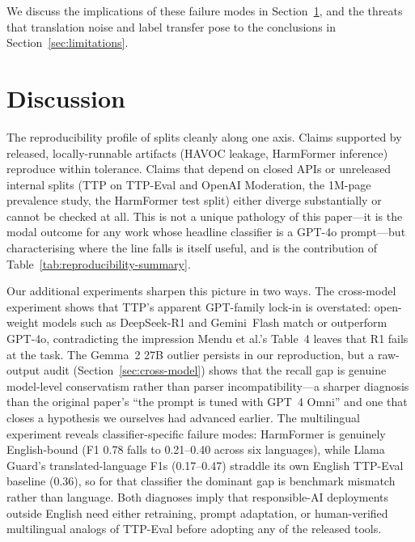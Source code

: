 \documentclass[10pt]{article} %
\begin{document}
We discuss the implications of these failure modes in Section~\ref{sec:discussion}, and the threats that translation noise and label transfer pose to the conclusions in Section~\ref{sec:limitations}.



\section{Discussion}
\label{sec:discussion}

The reproducibility profile of \citet{mendu2025saferpretraining} splits cleanly along one axis. Claims supported by released, locally-runnable artifacts (HAVOC leakage, HarmFormer inference) reproduce within tolerance. Claims that depend on closed APIs or unreleased internal splits (TTP on TTP-Eval and OpenAI Moderation, the 1M-page prevalence study, the HarmFormer test split) either diverge substantially or cannot be checked at all. This is not a unique pathology of this paper---it is the modal outcome for any work whose headline classifier is a GPT-4o prompt---but characterising where the line falls is itself useful, and is the contribution of Table~\ref{tab:reproducibility-summary}.

Our additional experiments sharpen this picture in two ways. The cross-model experiment shows that TTP's apparent GPT-family lock-in is overstated: open-weight models such as DeepSeek-R1 and Gemini~Flash match or outperform GPT-4o, contradicting the impression Mendu et al.'s Table~4 leaves that R1 fails at the task. The Gemma~2 27B outlier persists in our reproduction, but a raw-output audit (Section~\ref{sec:cross-model}) shows that the recall gap is genuine model-level conservatism rather than parser incompatibility---a sharper diagnosis than the original paper's ``the prompt is tuned with GPT~4 Omni'' and one that closes a hypothesis we ourselves had advanced earlier. The multilingual experiment reveals classifier-specific failure modes: HarmFormer is genuinely English-bound (F1 0.78 falls to 0.21--0.40 across six languages), while Llama Guard's translated-language F1s (0.17--0.47) straddle its own English TTP-Eval baseline (0.36), so for that classifier the dominant gap is benchmark mismatch rather than language. Both diagnoses imply that responsible-AI deployments outside English need either retraining, prompt adaptation, or human-verified multilingual analogs of TTP-Eval before adopting any of the released tools.
\end{document}
